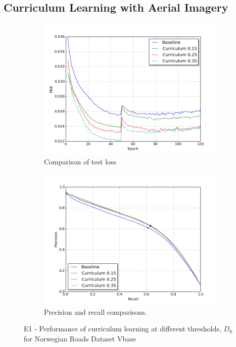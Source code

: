 \subsection{Curriculum Learning with Aerial Imagery}
\label{sec:results_curriculum_learning_aerial_imagery}

\begin{figure}[!h]
\begin{subfigure}{0.5\textwidth}
\includegraphics[width=\linewidth]{figs/E5/E5-lc.png}
\caption{Comparison of test loss} \label{fig:E5_curr_norway_loss}
\end{subfigure}
\hspace*{\fill} %
\begin{subfigure}{0.5\textwidth}
\includegraphics[width=\linewidth]{figs/E5/E5-pr.png}
\caption{Precision and recall comparisons.} \label{fig:E5_curr_norway_pr}
\end{subfigure}
\hspace*{\fill} %
\caption[E1 - Performance of curriculum learning for Norwegian Roads Dataset Vbase]{E1 - Performance of curriculum learning at different thresholds, $D_{0}$ for Norwegian Roads Dataset Vbase} \label{fig:E5_curriculum_norway}
\end{figure}

